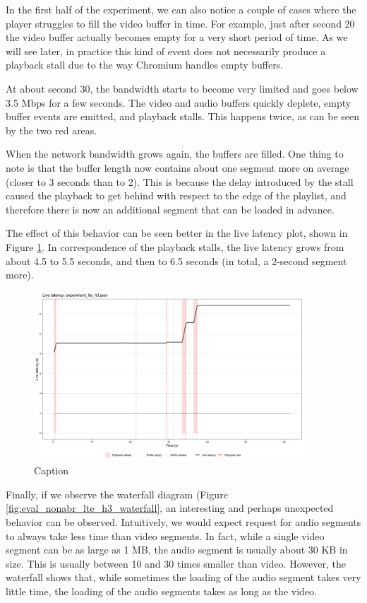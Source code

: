 In the first half of the experiment, we can also notice a couple of cases where the player struggles to fill the video buffer in time. For example, just after second 20 the video buffer actually becomes empty for a very short period of time. As we will see later, in practice this kind of event does not necessarily produce a playback stall due to the way Chromium handles empty buffers.

At about second 30, the bandwidth starts to become very limited and goes below 3.5 Mbps for a few seconds. The video and audio buffers quickly deplete, empty buffer events are emitted, and playback stalls. This happens twice, as can be seen by the two red areas.

When the network bandwidth grows again, the buffers are filled. One thing to note is that the buffer length now contains about one segment more on average (closer to 3 seconds than to 2). This is because the delay introduced by the stall caused the playback to get behind with respect to the edge of the playlist, and therefore there is now an additional segment that can be loaded in advance.

The effect of this behavior can be seen better in the live latency plot, shown in Figure \ref{fig:eval_nonabr_lte_h3_latency}. In correspondence of the playback stalls, the live latency grows from about 4.5 to 5.5 seconds, and then to 6.5 seconds (in total, a 2-second segment more).

\begin{figure}[h]
    \centering
    \includegraphics[width=0.9\textwidth]{res/eval_nonabr_lte_h3_latency.png}
    \caption{Caption}
    \label{fig:eval_nonabr_lte_h3_latency}
\end{figure}

Finally, if we observe the waterfall diagram (Figure \ref{fig:eval_nonabr_lte_h3_waterfall}, an interesting and perhaps unexpected behavior can be observed. Intuitively, we would expect request for audio segments to always take less time than video segments. In fact, while a single video segment can be as large as 1 MB, the audio segment is usually about 30 KB in size. This is usually between 10 and 30 times smaller than video. However, the waterfall shows that, while sometimes the loading of the audio segment takes very little time, the loading of the audio segments takes as long as the video.

